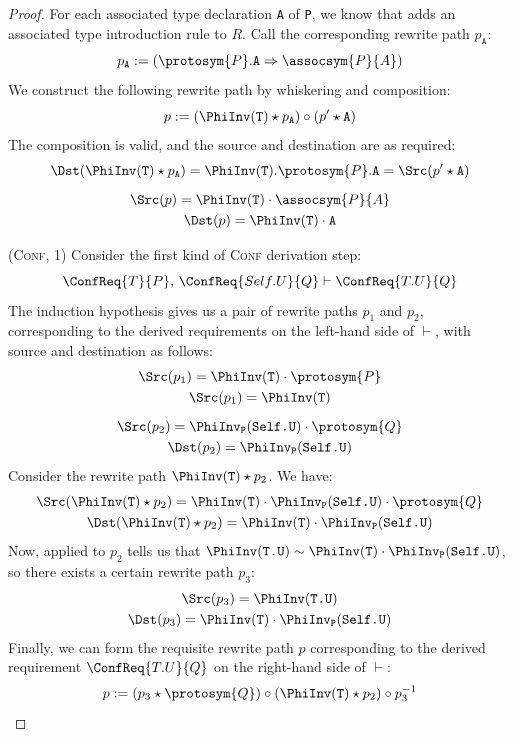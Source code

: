 \documentclass[../generics]{subfiles}
\begin{document}
\begin{proof}
For each associated type declaration \texttt{A} of \texttt{P}, we know that  adds an associated type introduction rule to $R$. Call the corresponding rewrite path $p_\texttt{A}$:
\[p_\texttt{A}:=(\protosym{P}.\texttt{A}\Rightarrow\assocsym{P}{A})\]
We construct the following rewrite path by whiskering and composition:
\[p:=(\PhiInv(\texttt{T})\star p_\texttt{A})\circ(p^\prime \star \texttt{A})\]
The composition is valid, and the source and destination are as required:
\begin{gather*}
\Dst(\PhiInv(\texttt{T})\star p_\texttt{A})=\PhiInv(\texttt{T}).\protosym{P}.\texttt{A}=\Src(p^\prime \star \texttt{A})\\[\medskipamount]
\Src(p)=\PhiInv(\texttt{T})\cdot\assocsym{P}{A}\\
\Dst(p)=\PhiInv(\texttt{T})\cdot\texttt{A}
\end{gather*}

(\textsc{Conf}, 1) Consider the first kind of \textsc{Conf} derivation step:
\[\ConfReq{T}{P},\,\ConfReq{Self.U}{Q}\vdash\ConfReq{T.U}{Q}\]
The induction hypothesis gives us a pair of rewrite paths $p_1$ and $p_2$, corresponding to the derived requirements on the left-hand side of $\vdash$, with source and destination as follows:
\begin{gather*}
\Src(p_1)=\PhiInv(\texttt{T})\cdot\protosym{P}\\
\Src(p_1)=\PhiInv(\texttt{T})\\[\medskipamount]
\Src(p_2)=\PhiInv_\texttt{P}(\texttt{Self.U})\cdot\protosym{Q}\\
\Dst(p_2)=\PhiInv_\texttt{P}(\texttt{Self.U})
\end{gather*}
Consider the rewrite path $\PhiInv(\texttt{T})\star p_2$. We have:
\begin{gather*}
\Src(\PhiInv(\texttt{T})\star p_2)= \PhiInv(\texttt{T})\cdot\PhiInv_\texttt{P}(\texttt{Self.U})\cdot\protosym{Q}\\
\Dst(\PhiInv(\texttt{T})\star p_2)= \PhiInv(\texttt{T})\cdot\PhiInv_\texttt{P}(\texttt{Self.U})
\end{gather*}
Now,  applied to $p_2$ tells us that $\PhiInv(\texttt{T.U})\sim\PhiInv(\texttt{T})\cdot\PhiInv_\texttt{P}(\texttt{Self.U})$, so there exists a certain rewrite path $p_3$:
\begin{gather*}
\Src(p_3) = \PhiInv(\texttt{T.U})\\
\Dst(p_3) = \PhiInv(\texttt{T})\cdot\PhiInv_\texttt{P}(\texttt{Self.U})
\end{gather*}
Finally, we can form the requisite rewrite path $p$ corresponding to the derived requirement $\ConfReq{T.U}{Q}$ on the right-hand side of $\vdash$:
\[p := (p_3\star\protosym{Q}) \circ (\PhiInv(\texttt{T})\star p_2) \circ p_3^{-1}\]


\end{proof}
\end{document}
